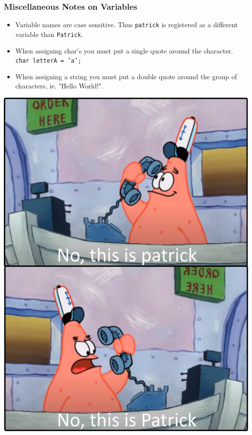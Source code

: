 \documentclass{if-beamer}
\begin{document}
\begin{frame}
\frametitle{Miscellaneous Notes on Variables}
\begin{minipage}{0.7\textwidth}
\begin{itemize}
\item Variable names are case sensitive. Thus \texttt{patrick} is registered as a different variable than \texttt{Patrick}.
\item When assigning char's you must put a single quote around the character. \\ \texttt{char letterA =  'a';}
\item When assigning a string you must put a double quote around the group of characters, ie. "Hello World!".
\end{itemize}
\end{minipage}
\begin{minipage}{0.3\textwidth}
\includegraphics[width = \textwidth]{figures/patrick}	
\end{minipage}

\end{frame}
\end{document}
